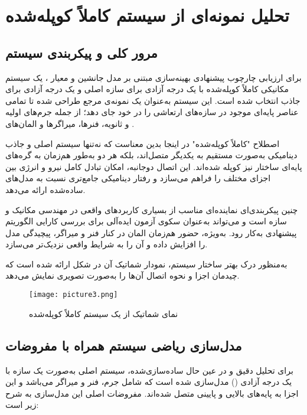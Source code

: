 \section{تحلیل نمونه‌ای از سیستم کاملاً کوپله‌شده }

\subsection{مرور کلی و پیکربندی سیستم}

برای ارزیابی چارچوب پیشنهادی بهینه‌سازی مبتنی بر مدل جانشین و معیار ، یک سیستم مکانیکی کاملاً کوپله‌شده با یک درجه آزادی برای سازه اصلی و یک درجه آزادی برای جاذب انتخاب شده است. این سیستم به‌عنوان یک نمونه‌ی مرجع طراحی شده تا تمامی عناصر پایه‌ای موجود در سازه‌های ارتعاشی را در خود جای دهد؛ از جمله جرم‌های اولیه و ثانویه، فنرها، میراگرها و المان‌های .

اصطلاح "کاملاً کوپله‌شده" در اینجا بدین معناست که نه‌تنها سیستم اصلی و جاذب دینامیکی به‌صورت مستقیم به یکدیگر متصل‌اند، بلکه هر دو به‌طور هم‌زمان به گره‌های پایه‌ای ساختار نیز کوپله شده‌اند. این اتصال دوجانبه، امکان تبادل کامل نیرو و انرژی بین اجزای مختلف را فراهم می‌سازد و رفتار دینامیکی جامع‌تری نسبت به مدل‌های ساده‌شده ارائه می‌دهد.

چنین پیکربندی‌ای نماینده‌ای مناسب از بسیاری کاربردهای واقعی در مهندسی مکانیک و سازه است و می‌تواند به‌عنوان سکوی آزمون ایده‌آلی برای بررسی کارایی الگوریتم پیشنهادی به‌کار رود. به‌ویژه، حضور هم‌زمان المان  در کنار فنر و میراگر، پیچیدگی مدل را افزایش داده و آن را به شرایط واقعی نزدیک‌تر می‌سازد.

به‌منظور درک بهتر ساختار سیستم، نمودار شماتیک آن در شکل  ارائه شده است که چیدمان اجزا و نحوه اتصال آن‌ها را به‌صورت تصویری نمایش می‌دهد.

\begin{figure}[H]
\centering
\texttt{[image: picture3.png]}
\caption{نمای شماتیک از یک سیستم کاملاً کوپله‌شده }
\label{fig:fully-coupled-1dof}
\end{figure}




\subsection{مدل‌سازی ریاضی سیستم همراه با مفروضات}

برای تحلیل دقیق و در عین حال ساده‌سازی‌شده، سیستم اصلی به‌صورت یک سازه با یک درجه آزادی () مدل‌سازی شده است که شامل جرم، فنر و میراگر می‌باشد و این اجزا به پایه‌های بالایی و پایینی متصل شده‌اند. مفروضات اصلی این مدل‌سازی به شرح زیر است:

